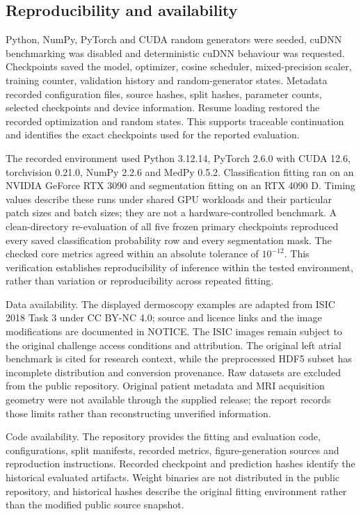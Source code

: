 \documentclass[11pt,a4paper]{article}
\begin{document}
\subsection*{Reproducibility and availability}

Python, NumPy, PyTorch and CUDA random generators were seeded, cuDNN benchmarking was disabled and deterministic cuDNN behaviour was requested. Checkpoints saved the model, optimizer, cosine scheduler, mixed-precision scaler, training counter, validation history and random-generator states. Metadata recorded configuration files, source hashes, split hashes, parameter counts, selected checkpoints and device information. Resume loading restored the recorded optimization and random states. This supports traceable continuation and identifies the exact checkpoints used for the reported evaluation.



The recorded environment used Python 3.12.14, PyTorch 2.6.0 with CUDA 12.6, torchvision 0.21.0, NumPy 2.2.6 and MedPy 0.5.2. Classification fitting ran on an NVIDIA GeForce RTX 3090 and segmentation fitting on an RTX 4090 D. Timing values describe these runs under shared GPU workloads and their particular patch sizes and batch sizes; they are not a hardware-controlled benchmark. A clean-directory re-evaluation of all five frozen primary checkpoints reproduced every saved classification probability row and every segmentation mask. The checked core metrics agreed within an absolute tolerance of $10^{-12}$. This verification establishes reproducibility of inference within the tested environment, rather than variation or reproducibility across repeated fitting.



Data availability. The displayed dermoscopy examples are adapted from ISIC 2018 Task 3 under CC BY-NC 4.0; source and licence links and the image modifications are documented in NOTICE. The ISIC images remain subject to the original challenge access conditions and attribution. The original left atrial benchmark is cited for research context, while the preprocessed HDF5 subset has incomplete distribution and conversion provenance. Raw datasets are excluded from the public repository. Original patient metadata and MRI acquisition geometry were not available through the supplied release; the report records those limits rather than reconstructing unverified information.



Code availability. The repository provides the fitting and evaluation code, configurations, split manifests, recorded metrics, figure-generation sources and reproduction instructions. Recorded checkpoint and prediction hashes identify the historical evaluated artifacts. Weight binaries are not distributed in the public repository, and historical hashes describe the original fitting environment rather than the modified public source snapshot.
\end{document}

